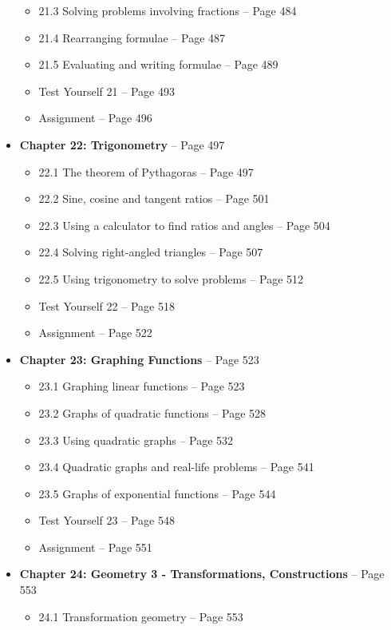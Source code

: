 \documentclass{article}
\begin{document}
\begin{itemize}
\begin{itemize}
            \item 21.3 Solving problems involving fractions -- Page 484
            \item 21.4 Rearranging formulae -- Page 487
            \item 21.5 Evaluating and writing formulae -- Page 489
            \item Test Yourself 21 -- Page 493
            \item Assignment -- Page 496
        \end{itemize}
    \item \textbf{Chapter 22: Trigonometry} -- Page 497
        \begin{itemize}
            \item 22.1 The theorem of Pythagoras -- Page 497
            \item 22.2 Sine, cosine and tangent ratios -- Page 501
            \item 22.3 Using a calculator to find ratios and angles -- Page 504
            \item 22.4 Solving right-angled triangles -- Page 507
            \item 22.5 Using trigonometry to solve problems -- Page 512
            \item Test Yourself 22 -- Page 518
            \item Assignment -- Page 522
        \end{itemize}
    \item \textbf{Chapter 23: Graphing Functions} -- Page 523
        \begin{itemize}
            \item 23.1 Graphing linear functions -- Page 523
            \item 23.2 Graphs of quadratic functions -- Page 528
            \item 23.3 Using quadratic graphs -- Page 532
            \item 23.4 Quadratic graphs and real-life problems -- Page 541
            \item 23.5 Graphs of exponential functions -- Page 544
            \item Test Yourself 23 -- Page 548
            \item Assignment -- Page 551
        \end{itemize}
    \item \textbf{Chapter 24: Geometry 3 - Transformations, Constructions} -- Page 553
        \begin{itemize}
            \item 24.1 Transformation geometry -- Page 553

\end{itemize}
\end{itemize}
\end{document}
